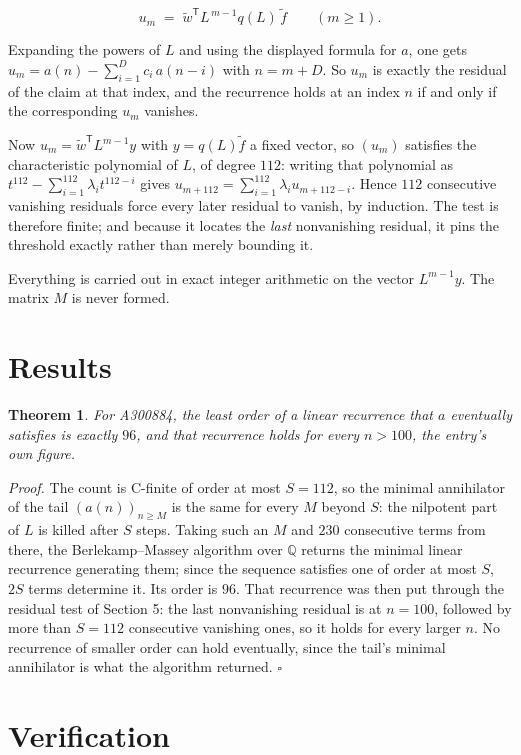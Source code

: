 \documentclass[11pt]{article}
\newtheorem{theorem}{Theorem}
\theoremstyle{definition}
\begin{document}
\[u_m \;=\; \tilde w^{\mathsf T} L^{\,m-1} q(L)\,\tilde f \qquad (m \ge 1).\]

Expanding the powers of $L$ and using the displayed formula for $a$, one gets $u_m = a(n) - \sum_{i=1}^{D} c_i\,a(n-i)$ with $n = m + D$. So $u_m$ is exactly the residual of the claim at that index, and the recurrence holds at an index $n$ if and only if the corresponding $u_m$ vanishes.

Now $u_m = \tilde w^{\mathsf T} L^{m-1} y$ with $y = q(L)\tilde f$ a fixed vector, so $(u_m)$ satisfies the characteristic polynomial of $L$, of degree $112$: writing that polynomial as $t^{112} - \sum_{i=1}^{112} \lambda_i t^{112-i}$ gives $u_{m+112} = \sum_{i=1}^{112} \lambda_i u_{m+112-i}$. Hence $112$ consecutive vanishing residuals force every later residual to vanish, by induction. The test is therefore finite; and because it locates the {\itshape last} nonvanishing residual, it pins the threshold exactly rather than merely bounding it.

Everything is carried out in exact integer arithmetic on the vector $L^{m-1}y$. The matrix $M$ is never formed.

\section{Results}

\begin{theorem} For A300884, the least order of a linear recurrence that $a$ eventually satisfies is exactly $96$, and that recurrence holds for every $n > 100$, the entry's own figure.\end{theorem}

{\itshape Proof.} The count is C-finite of order at most $S = 112$, so the minimal annihilator of the tail $(a(n))_{n \ge M}$ is the same for every $M$ beyond $S$: the nilpotent part of $L$ is killed after $S$ steps. Taking such an $M$ and $230$ consecutive terms from there, the Berlekamp--Massey algorithm over $\mathbb{Q}$ returns the minimal linear recurrence generating them; since the sequence satisfies one of order at most $S$, $2S$ terms determine it. Its order is $96$. That recurrence was then put through the residual test of Section 5: the last nonvanishing residual is at $n = 100$, followed by more than $S = 112$ consecutive vanishing ones, so it holds for every larger $n$. No recurrence of smaller order can hold eventually, since the tail's minimal annihilator is what the algorithm returned. $\square$

\section{Verification}
\end{document}
